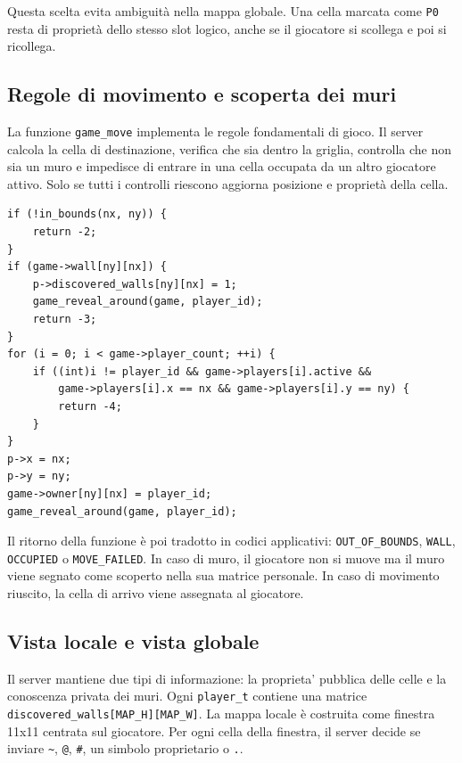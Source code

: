 \documentclass[11pt,a4paper]{article}
\begin{document}
Questa scelta evita ambiguità nella mappa globale. Una cella marcata come
\texttt{P0} resta di proprietà dello stesso slot logico, anche se il giocatore
si scollega e poi si ricollega.

\subsection{Regole di movimento e scoperta dei muri}

La funzione \texttt{game\_move} implementa le regole fondamentali di gioco. Il
server calcola la cella di destinazione, verifica che sia dentro la griglia,
controlla che non sia un muro e impedisce di entrare in una cella occupata da un
altro giocatore attivo. Solo se tutti i controlli riescono aggiorna posizione e proprietà della cella.

\begin{lstlisting}[style=cstyle, caption={Validazione del movimento e aggiornamento della proprieta'.}]
if (!in_bounds(nx, ny)) {
    return -2;
}
if (game->wall[ny][nx]) {
    p->discovered_walls[ny][nx] = 1;
    game_reveal_around(game, player_id);
    return -3;
}
for (i = 0; i < game->player_count; ++i) {
    if ((int)i != player_id && game->players[i].active &&
        game->players[i].x == nx && game->players[i].y == ny) {
        return -4;
    }
}
p->x = nx;
p->y = ny;
game->owner[ny][nx] = player_id;
game_reveal_around(game, player_id);
\end{lstlisting}

Il ritorno della funzione è poi tradotto in codici applicativi:
\texttt{OUT\_OF\_BOUNDS}, \texttt{WALL}, \texttt{OCCUPIED} o
\texttt{MOVE\_FAILED}. In caso di muro, il giocatore non si muove ma il muro
viene segnato come scoperto nella sua matrice personale. In caso di movimento
riuscito, la cella di arrivo viene assegnata al giocatore.

\subsection{Vista locale e vista globale}

Il server mantiene due tipi di informazione: la proprieta' pubblica delle celle
e la conoscenza privata dei muri. Ogni \texttt{player\_t} contiene una matrice
\texttt{discovered\_walls[MAP\_H][MAP\_W]}. La mappa locale è costruita come
finestra 11x11 centrata sul giocatore. Per ogni cella della finestra, il server
decide se inviare \texttt{\textasciitilde}, \texttt{@}, \texttt{\#}, un simbolo
proprietario o \texttt{.}.
\end{document}
